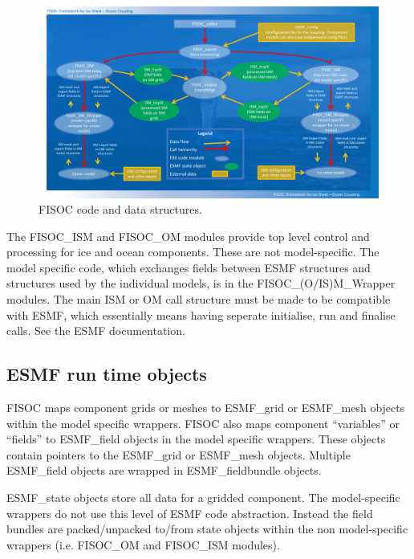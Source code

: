 \documentclass[11pt]{article}
\begin{document}
\begin{figure}[t]
  \vspace*{2mm}
  \begin{center}
    \includegraphics[width=17cm]{FISOC_structure2.pdf}
  \end{center}
  \caption{FISOC code and data structures.}
  \label{fig:codeStruct}
\end{figure}

The FISOC\_ISM and FISOC\_OM modules provide top level control and processing for ice and ocean
components.
These are not model-specific.
The model specific code, which exchanges fields between 
ESMF structures and structures used by the individual models, is in the FISOC\_(O/IS)M\_Wrapper modules.
The main ISM or OM call structure must be made to be compatible with ESMF, which essentially means 
having seperate initialise, run and finalise calls.  See the ESMF documentation.





\subsection{ESMF run time objects}

FISOC maps component grids or meshes to ESMF\_grid or ESMF\_mesh objects within the model
specific wrappers. 
FISOC also maps component ``variables''  or ``fields'' to ESMF\_field objects
in the model specific wrappers.
These objects contain pointers to the ESMF\_grid or ESMF\_mesh objects. 
Multiple  ESMF\_field objects are wrapped in ESMF\_fieldbundle objects.

ESMF\_state objects store all data for a gridded component.
The model-specific wrappers do not use this level of ESMF code abstraction.
Instead the field bundles are packed/unpacked to/from state objects
within the non model-specific wrappers
(i.e. FISOC\_OM and FISOC\_ISM modules).
\end{document}
